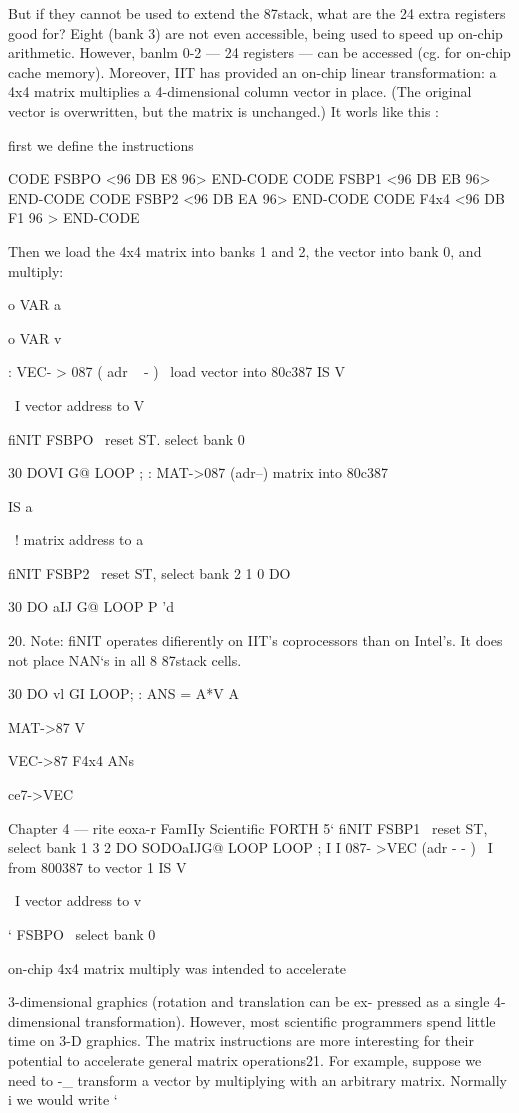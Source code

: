 {But if they cannot be used to extend the 87stack, what are the 24
extra registers good for? Eight (bank 3) are not even accessible,
being used to speed up on-chip arithmetic. However, banlm 0-2
— 24 registers — can be accessed (cg. for on-chip cache memory).
Moreover, IIT has provided an on-chip linear transformation: a
4x4 matrix multiplies a 4-dimensional column vector in place. (The
original vector is overwritten, but the matrix is unchanged.) It worls
like this :

first we define the instructions

CODE FSBPO <96 DB E8 96> END-CODE
CODE FSBP1 <96 DB EB 96> END-CODE
CODE FSBP2 <96 DB EA 96> END-CODE
CODE F4x4 <96 DB F1 96 > END-CODE

Then we load the 4x4 matrix into banks 1 and 2, the vector into
bank 0, and multiply:

o VAR a{{ o VAR v{

: VEC- > 087 ( adr ~ - ) \ load vector into 80c387
IS V{ \ I vector address to V{
fiNIT FSBPO \ reset ST. select bank 0

30 DOV{I} G@ LOOP ;
: MAT->087 (adr--) \Ioad matrix into 80c387

IS a{{ \ ! matrix address to a{{
fiNIT FSBP2 \ reset ST, select bank 2
1 0 DO

30 DO a{{IJ}} G@ LOOP
P \cont'd

 

20. Note: fiNIT operates difierently on IIT’s coprocessors than on Intel’s. It does not place NAN‘s
in all 8 87stack cells.

30 DO v{l} GI LOOP;
\example: ANS = A*V
A{{ MAT->87 V{ VEC->87 F4x4 ANs{ce7->VEC

Chapter 4 — rite eoxa-r FamIIy Scientific FORTH 5‘
fiNIT FSBP1 \ reset ST, select bank 1
3 2 DO
SODOa{{IJ}}G@ LOOP
LOOP ; I
I
087- >VEC (adr - - ) \ I from 800387 to vector 1
IS V{ \ I vector address to v{ ‘
FSBPO \ select bank 0 %

 

 on-chip 4x4 matrix multiply was intended to accelerate

3-dimensional graphics (rotation and translation can be ex-
pressed as a single 4-dimensional transformation). However, most
scientific programmers spend little time on 3-D graphics. The matrix
instructions are more interesting for their potential to accelerate
general matrix operations21. For example, suppose we need to -_
transform a vector by multiplying with an arbitrary matrix. Normally i
we would write ‘

}}}}}}}}}}}}}}}}
